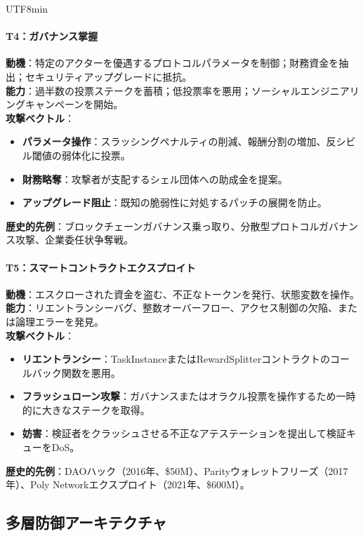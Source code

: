 \documentclass[11pt]{article}
\begin{document}
\begin{CJK}{UTF8}{min}
\begin{itemize}[noitemsep]
\paragraph{T4：ガバナンス掌握}
\textbf{動機}：特定のアクターを優遇するプロトコルパラメータを制御；財務資金を抽出；セキュリティアップグレードに抵抗。\\
\textbf{能力}：過半数の投票ステークを蓄積；低投票率を悪用；ソーシャルエンジニアリングキャンペーンを開始。\\
\textbf{攻撃ベクトル}：
\begin{itemize}[noitemsep]
  \item \textbf{パラメータ操作}：スラッシングペナルティの削減、報酬分割の増加、反シビル閾値の弱体化に投票。
  \item \textbf{財務略奪}：攻撃者が支配するシェル団体への助成金を提案。
  \item \textbf{アップグレード阻止}：既知の脆弱性に対処するパッチの展開を防止。
\end{itemize}
\textbf{歴史的先例}：ブロックチェーンガバナンス乗っ取り、分散型プロトコルガバナンス攻撃、企業委任状争奪戦。

\paragraph{T5：スマートコントラクトエクスプロイト}
\textbf{動機}：エスクローされた資金を盗む、不正なトークンを発行、状態変数を操作。\\
\textbf{能力}：リエントランシーバグ、整数オーバーフロー、アクセス制御の欠陥、または論理エラーを発見。\\
\textbf{攻撃ベクトル}：
\begin{itemize}[noitemsep]
  \item \textbf{リエントランシー}：TaskInstanceまたはRewardSplitterコントラクトのコールバック関数を悪用。
  \item \textbf{フラッシュローン攻撃}：ガバナンスまたはオラクル投票を操作するため一時的に大きなステークを取得。
  \item \textbf{妨害}：検証者をクラッシュさせる不正なアテステーションを提出して検証キューをDoS。
\end{itemize}
\textbf{歴史的先例}：DAOハック（2016年、\$50M）、Parityウォレットフリーズ（2017年）、Poly Networkエクスプロイト（2021年、\$600M）。

\subsection{多層防御アーキテクチャ}


\end{itemize}
\end{CJK}
\end{document}
